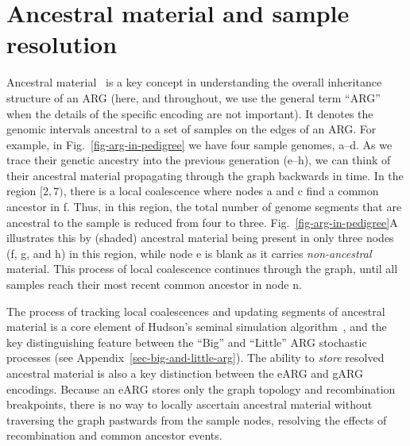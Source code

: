 \documentclass{article}
\newcommand{\noderef}[1]{\textsf{#1}}
\begin{document}
\section{Ancestral material and sample resolution}
\label{sec-ancestral-material}
Ancestral material~\citep{wiuf1999ancestry,wiuf1999recombination}
is a key concept in understanding the overall inheritance structure
of an ARG (here, and throughout, we use the general term ``ARG'' when
the details of the specific encoding are not important).
It denotes the genomic intervals ancestral to a set of samples
on the edges of an ARG.
For example, in Fig.~\ref{fig-arg-in-pedigree} we have
four sample genomes, \noderef{a}--\noderef{d}. As we
trace their genetic ancestry into the previous generation
(\noderef{e}--\noderef{h}), we can think of their ancestral
material propagating through the graph
backwards in time. In the region $[2, 7)$, there is a
local coalescence where nodes \noderef{a} and \noderef{c}
find a common ancestor in \noderef{f}. Thus, in this region,
the total number of genome segments that are ancestral to the
sample is reduced from four to three. Fig.~\ref{fig-arg-in-pedigree}A
illustrates this by (shaded) ancestral material being present
in only three nodes (\noderef{f}, \noderef{g}, and \noderef{h}) in this region,
while node \noderef{e} is blank
as it carries \emph{non-ancestral} material.
This process of local coalescence continues through the
graph, until all samples reach their most recent common
ancestor in node \noderef{n}.

The process of tracking local coalescences and updating
segments of ancestral material is a core element of
Hudson's seminal simulation
algorithm~\citep{hudson1983testing,kelleher2016efficient},
and the key distinguishing feature between the
``Big'' and ``Little'' ARG stochastic processes
(see Appendix~\ref{sec-big-and-little-arg}).
The ability to \emph{store} resolved ancestral material
is also a key distinction between the eARG and gARG
encodings. Because an eARG stores only the graph topology and
recombination breakpoints, there is no way to locally
ascertain ancestral material without traversing the graph
pastwards from the sample nodes,
resolving the effects of recombination and common ancestor events.
\end{document}
